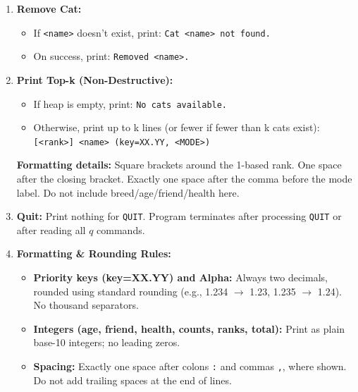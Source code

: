 \documentclass[11pt]{article}
\begin{document}
\begin{enumerate}
    \item \textbf{Remove Cat:}
    \begin{itemize}
        \item If \texttt{<name>} doesn't exist, print: \texttt{Cat <name> not found.}
        \item On success, print: \texttt{Removed <name>.}
    \end{itemize}

    \item \textbf{Print Top-k (Non-Destructive):}
    \begin{itemize}
        \item If heap is empty, print: \texttt{No cats available.}
        \item Otherwise, print up to k lines (or fewer if fewer than k cats exist): \\
        \texttt{[<rank>] <name> (key=XX.YY, <MODE>)}
    \end{itemize}
    \textbf{Formatting details:} Square brackets around the 1-based rank. One space after the closing bracket. Exactly one space after the comma before the mode label. Do not include breed/age/friend/health here.

    \item \textbf{Quit:} Print nothing for \texttt{QUIT}. Program terminates after processing \texttt{QUIT} or after reading all $q$ commands.

    \item \textbf{Formatting \& Rounding Rules:}
    \begin{itemize}
        \item \textbf{Priority keys (key=XX.YY) and Alpha:} Always two decimals, rounded using standard rounding (e.g., 1.234 $\rightarrow$ 1.23, 1.235 $\rightarrow$ 1.24). No thousand separators.
        \item \textbf{Integers (age, friend, health, counts, ranks, total):} Print as plain base-10 integers; no leading zeros.
        \item \textbf{Spacing:} Exactly one space after colons \texttt{:} and commas \texttt{,}, where shown. Do not add trailing spaces at the end of lines.
    \end{itemize}
\end{enumerate}
\end{document}
